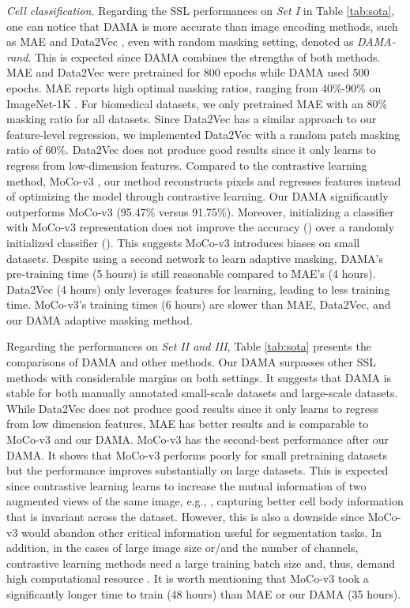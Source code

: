\documentclass[10pt,twocolumn,letterpaper]{article}
\begin{document}
\textcolor{nblue}{\textit{Cell classification.}} 
Regarding the SSL performances on \textit{Set I} in Table \ref{tab:sota}, one can notice that DAMA is more accurate than image encoding methods, such as MAE \cite{mae} and Data2Vec \cite{data2vec}, even with random masking setting, denoted as \textit{DAMA-rand}. This is expected since DAMA combines the strengths of both methods. MAE and Data2Vec were pretrained for 800 epochs while DAMA used 500 epochs. MAE reports high optimal masking ratios, ranging from 40\%-90\% on ImageNet-1K \cite{imagenet}. For biomedical datasets, we only pretrained MAE with an 80\% masking ratio for all datasets. Since Data2Vec has a similar approach to our feature-level regression, we implemented Data2Vec with a random patch masking ratio of 60\%. Data2Vec does not produce good results since it only learns to regress from low-dimension features.
Compared to the contrastive learning method, MoCo-v3 \cite{mocov3}, our method reconstructs pixels and regresses features instead of optimizing the model through contrastive learning. Our DAMA significantly outperforms MoCo-v3 (95.47\% versus 91.75\%). Moreover, initializing a classifier with MoCo-v3 representation does not improve the accuracy () over a randomly initialized classifier (). This suggests MoCo-v3 introduces biases on small datasets. Despite using a second network to learn adaptive masking, DAMA's pre-training time (5 hours) is still reasonable compared to MAE's (4 hours). Data2Vec (4 hours) only leverages features for learning, leading to less training time. MoCo-v3's training times (6 hours) are slower than MAE, Data2Vec, and our DAMA adaptive masking method.

Regarding the performances on \textit{Set II and III}, Table \ref{tab:sota} presents the comparisons of DAMA and other methods. Our DAMA surpasses other SSL methods with considerable margins on both settings. It suggests that DAMA is stable for both manually annotated small-scale datasets and large-scale datasets. While Data2Vec \cite{data2vec} does not produce good results since it only learns to regress from low dimension features, MAE \cite{mae} has better results and is comparable to MoCo-v3 \cite{mocov3} and our DAMA. MoCo-v3 has the second-best performance after our DAMA. It shows that MoCo-v3 performs poorly for small pretraining datasets but the performance improves substantially on large datasets. This is expected since contrastive learning learns to increase the mutual information of two augmented views of the same image, e.g., , capturing better cell body information that is invariant across the dataset. However, this is also a downside since MoCo-v3 would abandon other critical information useful for segmentation tasks. In addition, in the cases of large image size or/and the number of channels, contrastive learning methods need a large training batch size and, thus, demand high computational resource \cite{ssl2,byol,simclr,moco,mocov3}. It is worth mentioning that MoCo-v3 took a significantly longer time to train (48 hours) than MAE \cite{mae} or our DAMA (35 hours).
\end{document}
